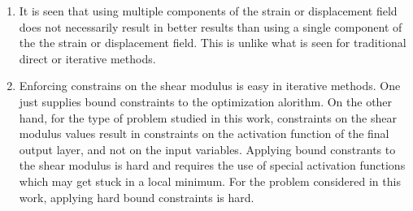 \documentclass[12pt]{article}
\begin{document}
\begin{enumerate}
\item{It is seen that using multiple components of the strain or displacement field does not necessarily result in better results than using a single component of the the strain or displacement field. This is unlike what is seen for traditional direct or iterative methods.}
\item{Enforcing constrains on the shear modulus is easy in iterative methods. One just supplies bound constraints to the optimization alorithm. On the other hand, for the type of problem studied in this work, constraints on the shear modulus values result in constraints on the activation function of the final output layer, and not on the input variables. Applying bound constrants to the shear modulus is hard and requires the use of special activation functions which may get stuck in a local minimum. For the problem considered in this work, applying hard bound constraints is hard.}
\end{enumerate}
\clearpage
{}

\end{document}
